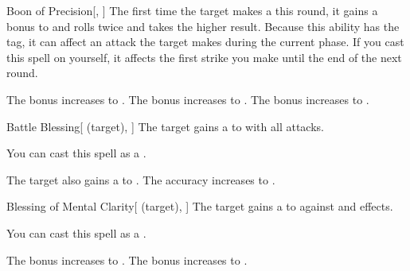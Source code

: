 \lowercase{\hypertarget{spell:Boon of Precision}{}}\label{spell:Boon of Precision}
\begin{freeability}[Rank 1]{\hypertarget{spell:Boon of Precision}{Boon of Precision}}[, ]
The first time the target makes a  this round,
it gains a  bonus to  and rolls twice and takes the higher result.
Because this ability has the  tag, it can affect an attack the target makes during the current phase.
If you cast this spell on yourself, it affects the first strike you make until the end of the next round.

\rankline
{} The bonus increases to .
 The bonus increases to .
 The bonus increases to .
\end{freeability}
\vspace{0.25em}



\lowercase{\hypertarget{spell:Battle Blessing}{}}\label{spell:Battle Blessing}
\begin{attuneability}[Rank 3]{\hypertarget{spell:Battle Blessing}{Battle Blessing}}[ (target), ]
The target gains a   to  with all attacks.

You can cast this spell as a .

\rankline
{} The target also gains a   to .
 The accuracy increases to .
\end{attuneability}
\vspace{0.25em}



\lowercase{\hypertarget{spell:Blessing of Mental Clarity}{}}\label{spell:Blessing of Mental Clarity}
\begin{attuneability}[Rank 3]{\hypertarget{spell:Blessing of Mental Clarity}{Blessing of Mental Clarity}}[ (target), ]
The target gains a   to  against  and  effects.

You can cast this spell as a .

\rankline
{} The bonus increases to .
 The bonus increases to .
\end{attuneability}
\vspace{0.25em}



